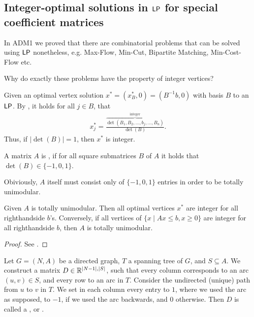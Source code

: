 \subsection{Integer-optimal solutions in $\mathsf{LP}$ for special coefficient matrices}
\begin{recall}
    In ADM1 we proved that there are combinatorial problems that can be solved using $\mathsf{LP}$ nonetheless, e.g.
    Max-Flow, Min-Cut, Bipartite Matching, Min-Cost-Flow etc.
\end{recall}
\begin{question}
    Why do exactly these problems have the property of integer vertices?
\end{question}
Given an optimal vertex solution $x^*=(x_B^*,0)=(B^{-1}b,0)$ with basis $B$ to an $\mathsf{LP}$.
By , it holds for all $j \in B$, that
\begin{align*}
    x_j^* = \frac{\overbrace{\det(B_1,B_2,...,b_j,...,B_n)}^{\text{integer}}}{\det(B)}.
\end{align*}
Thus, if $|\det(B)|=1$, then $x^*$ is integer.
\begin{definition}
    A matrix $A$ is , if for all square submatrices $B$ of $A$ it holds
    that $\det(B) \in \{-1,0,1\}$.
\end{definition}
\begin{note}
    Obiviously, $A$ itself must consist only of $\{-1,0,1\}$ entries in order to be totally unimodular.
\end{note}
\begin{theorem}
    Given $A$ is totally unimodular. Then all optimal vertices $x^*$ are integer for all righthandside $b$'s.
    Conversely, if all vertices of $\{x \mid Ax\leq b, x \geq 0\}$ are integer for all righthandside $b$, then $A$ is totally unimodular.
\end{theorem}
\begin{proof}
    See \cite[Thm~2.5~III~1.2]{int-comb-optimization}.
\end{proof}
\begin{definition}
    Let $G=(N,A)$ be a directed graph, $T$ a spanning tree of $G$,
    and $S \subseteq A$. We construct a matrix $D \in \mathbb{R}^{|N-1|,|S|}$,
    such that every column corresponds to an arc $(u,v) \in S$, and every row to an arc in $T$.
    Consider the undirected (unique) path from $u$ to $v$ in $T$.
    We set in each column every entry to $1$, where we used the arc as supposed, to $-1$, if we used the arc backwards, and $0$ otherwise.
    Then $D$ is called a , or .
\end{definition}
